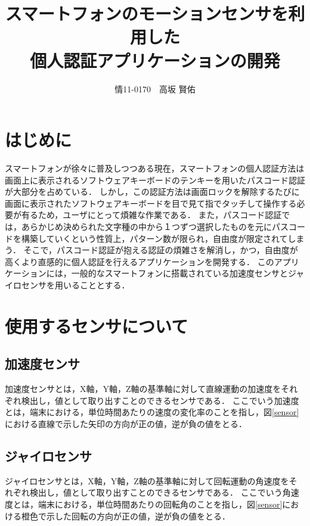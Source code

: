 \documentclass[11pt]{jreport}
\title{\bfseries スマートフォンのモーションセンサを利用した\\個人認証アプリケーションの開発}
\author{情11-0170　高坂 賢佑}
\date{}
\begin{document}
\maketitle

\tableofcontents
\listoffigures

\chapter*{はじめに}
スマートフォンが徐々に普及しつつある現在，スマートフォンの個人認証方法は画面上に表示されるソフトウェアキーボードのテンキーを用いたパスコード認証が大部分を占めている．
しかし，この認証方法は画面ロックを解除するたびに画面に表示されたソフトウェアキーボードを目で見て指でタッチして操作する必要が有るため，ユーザにとって煩雑な作業である．
また，パスコード認証では，あらかじめ決められた文字種の中から１つずつ選択したものを元にパスコードを構築していくという性質上，パターン数が限られ，自由度が限定されてしまう．
そこで，パスコード認証が抱える認証の煩雑さを解消し，かつ，自由度が高くより直感的に個人認証を行えるアプリケーションを開発する．
このアプリケーションには，一般的なスマートフォンに搭載されている加速度センサとジャイロセンサを用いることとする．

\chapter{使用するセンサについて}
	\section{加速度センサ}
	加速度センサとは，X軸，Y軸，Z軸の基準軸に対して直線運動の加速度をそれぞれ検出し，値として取り出すことのできるセンサである．
	ここでいう加速度とは，端末における，単位時間あたりの速度の変化率のことを指し，図\ref{sensor}における直線で示した矢印の方向が正の値，逆が負の値をとる．
	
	\section{ジャイロセンサ}
	ジャイロセンサとは，X軸，Y軸，Z軸の基準軸に対して回転運動の角速度をそれぞれ検出し，値として取り出すことのできるセンサである．
    ここでいう角速度とは，端末における，単位時間あたりの回転角のことを指し，図\ref{sensor}における橙色で示した回転の方向が正の値，逆が負の値をとる．
\end{document}
